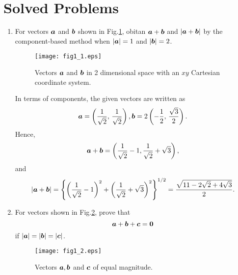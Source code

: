 \documentclass[10pt,a4j]{article}
\begin{document}
\section{Solved Problems}
\begin{enumerate}
\item
    For vectors $\mbox{\boldmath $a$}$ and $\mbox{\boldmath $b$}$ shown in Fig.\ref{fig:fig1_1}, 
    obitan $\mbox{\boldmath $a$}+\mbox{\boldmath $b$}$ and $\left| \mbox{\boldmath $a$}+\mbox{\boldmath $b$} \right|$ 
    by the component-based method when $|\mbox{\boldmath $a$}|=1$ and $|\mbox{\boldmath $b$}|=2$. 
    \begin{figure}
        \begin{center}
        \texttt{[image: fig1\_1.eps]} 
        \end{center}
        \caption{Vectors $\mbox{\boldmath $a$}$ and $\mbox{\boldmath $b$}$ in 2 dimensional space with an $xy$ Cartesian coordinate system.}
        \label{fig:fig1_1}
    \end{figure}

    {\small
    In terms of components, the given vectors are written as 
    \[
        \mbox{\boldmath $a$}= \left( \frac{1}{\sqrt{2}}, \, \frac{1}{\sqrt{2}}\right), 
        \mbox{\boldmath $b$}=2 \left( -\frac{1}{2}, \, \frac{\sqrt{3}}{2}\right).
    \]
    Hence,
    \[
        \mbox{\boldmath $a$}+\mbox{\boldmath $b$}=\left( \frac{1}{\sqrt{2}}-1, \frac{1}{\sqrt{2}}+\sqrt{3}\right),
    \]
    and 
    \[
        | \mbox{\boldmath $a$}+\mbox{\boldmath $b$}| = 
        \left\{
        \left( \frac{1}{\sqrt{2}}-1\right)^2 +
        \left( \frac{1}{\sqrt{2}}+\sqrt{3}\right)^2
        \right\}^{1/2}
        =
        \frac{\sqrt{11-2\sqrt{2}+4\sqrt{3}}}{2}.
    \]
    }
\item
    For vectors shown in Fig.\ref{fig:fig1_2}, prove that 
    \[
        \mbox{\boldmath $a$}+\mbox{\boldmath $b$}+\mbox{\boldmath $c$}=\mbox{\boldmath $0$}
    \]
    if $|\mbox{\boldmath $a$}|=|\mbox{\boldmath $b$}|=|\mbox{\boldmath $c$}|$.\\
    \begin{figure}[h]
    \begin{center}
        \texttt{[image: fig1\_2.eps]} 
        \end{center}
        \caption{Vectors $\mbox{\boldmath $a$}, \mbox{\boldmath $b$}$ and $\mbox{\boldmath $c$}$ of equal magnitude.} 
        \label{fig:fig1_2}
    \end{figure}


\end{enumerate}
\end{document}
